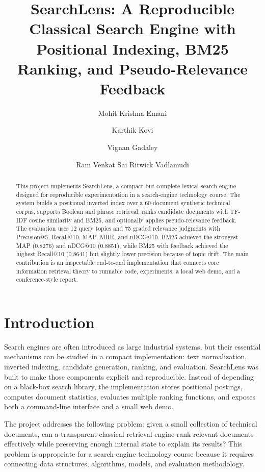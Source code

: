 \documentclass[sigconf,nonacm]{acmart}
\title{SearchLens: A Reproducible Classical Search Engine with Positional Indexing, BM25 Ranking, and Pseudo-Relevance Feedback}
\author{Mohit Krishna Emani}
\author{Karthik Kovi}
\author{Vignan Gadaley}
\author{Ram Venkat Sai Ritwick Vadlamudi}
\affiliation{%
  \institution{California State University, Long Beach}
  \city{Long Beach}
  \state{California}
  \country{USA}}
\begin{document}
\begin{abstract}
This project implements SearchLens, a compact but complete lexical search engine designed for reproducible experimentation in a search-engine technology course. The system builds a positional inverted index over a 60-document synthetic technical corpus, supports Boolean and phrase retrieval, ranks candidate documents with TF-IDF cosine similarity and BM25, and optionally applies pseudo-relevance feedback. The evaluation uses 12 query topics and 75 graded relevance judgments with Precision@5, Recall@10, MAP, MRR, and nDCG@10. BM25 achieved the strongest MAP (0.8276) and nDCG@10 (0.8851), while BM25 with feedback achieved the highest Recall@10 (0.8641) but slightly lower precision because of topic drift. The main contribution is an inspectable end-to-end implementation that connects core information retrieval theory to runnable code, experiments, a local web demo, and a conference-style report.
\end{abstract}


\maketitle

\section{Introduction}
Search engines are often introduced as large industrial systems, but their essential mechanisms can be studied in a compact implementation: text normalization, inverted indexing, candidate generation, ranking, and evaluation. SearchLens was built to make those components explicit and reproducible. Instead of depending on a black-box search library, the implementation stores positional postings, computes document statistics, evaluates multiple ranking functions, and exposes both a command-line interface and a small web demo.

The project addresses the following problem: given a small collection of technical documents, can a transparent classical retrieval engine rank relevant documents effectively while preserving enough internal state to explain its results? This problem is appropriate for a search-engine technology course because it requires connecting data structures, algorithms, models, and evaluation methodology.
\end{document}

